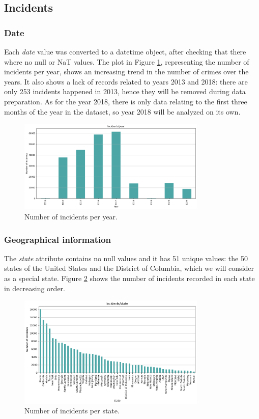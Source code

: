 \documentclass[11pt,a4paper]{report}
\begin{document}
\subsection{Incidents}

\subsubsection{Date}

Each \textit{date} value was converted to a datetime object, after checking that there where no null or NaT values.
The plot in Figure \ref{incidents_per_year}, representing the number of incidents per year, shows an increasing trend in the number of crimes over the years.
It also shows a lack of records related to years 2013 and 2018: there are only 253 incidents happened in 2013, hence they will be removed during data preparation.
As for the year 2018, there is only data relating to the first three months of the year in the dataset, so year 2018 will be analyzed on its own.

\begin{figure}[h]
	\includegraphics[width=0.8\textwidth]{incidents_per_year}
	\centering
	\caption{Number of incidents per year.}
	\label{incidents_per_year}
\end{figure}

\subsubsection{Geographical information}

The \textit{state} attribute contains no null values and it has 51 unique values: the 50 states of the United States and the District of Columbia, which we will consider as a special state.
Figure \ref{incidents_per_state} shows the number of incidents recorded in each state in decreasing order.

\begin{figure}[h]
	\includegraphics[width=0.8\textwidth]{incidents_per_state}
	\centering
	\caption{Number of incidents per state.}
	\label{incidents_per_state}
\end{figure}
\end{document}
